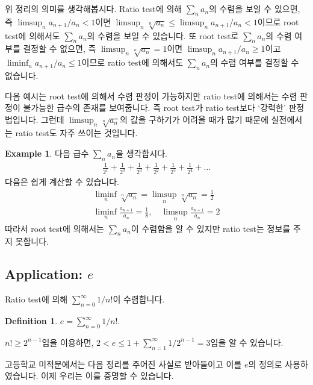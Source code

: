 \documentclass[12pt]{article}
\theoremstyle{definition}
\newtheorem{defn}[thm]{Definition}
\newtheorem*{ex}{Example}
\begin{document}
위 정리의 의미를 생각해봅시다. Ratio test에 의해 \(\sum_n a_n\)의 수렴을 보일 수 있으면, 즉 \(\limsup_n a_{n+1}/a_n < 1\)이면 \(\limsup_n \sqrt[n]{a_n} \le \limsup_n a_{n+1}/a_n < 1\)이므로 root test에 의해서도 \(\sum_n a_n\)의 수렴을 보일 수 있습니다. 또 root test로 \(\sum_n a_n\)의 수렴 여부를 결정할 수 없으면, 즉 \(\limsup_n \sqrt[n]{a_n} = 1\)이면 \(\limsup_n a_{n+1}/a_n \ge 1\)이고 \(\liminf_n a_{n+1}/a_n \le 1\)이므로 ratio test에 의해서도 \(\sum_n a_n\)의 수렴 여부를 결정할 수 없습니다.
\par 다음 예시는 root test에 의해서 수렴 판정이 가능하지만 ratio test에 의해서는 수렴 판정이 불가능한 급수의 존재를 보여줍니다. 즉 root test가 ratio test보다 `강력한' 판정법입니다. 그런데 \(\limsup_n \sqrt[n]{a_n}\)의 값을 구하기가 어려울 때가 많기 때문에 실전에서는 ratio test도 자주 쓰이는 것입니다.

\begin{ex}
	다음 급수 \(\sum_n a_n\)을 생각합시다.
	\begin{gather*}
		\frac{1}{2^1} + \frac{1}{2^0} + \frac{1}{2^3} + \frac{1}{2^2} + \frac{1}{2^5} + \frac{1}{2^4} + \ldots
	\end{gather*}
	다음은 쉽게 계산할 수 있습니다.
	\begin{gather*}
		\liminf_n \sqrt[n]{a_n} = \limsup_n \sqrt[n]{a_n} = \frac{1}{2}\\
		\liminf_n \frac{a_{n+1}}{a_n} = \frac{1}{8}, \quad \limsup_n \frac{a_{n+1}}{a_n} = 2
	\end{gather*}
	따라서 root test에 의해서는 \(\sum_n a_n\)이 수렴함을 알 수 있지만 ratio test는 정보를 주지 못합니다.
\end{ex}

\subsection{Application: \(e\)}

Ratio test에 의해 \(\sum_{n=0}^\infty 1/n!\)이 수렴합니다.

\begin{defn}
	\(e = \sum_{n=0}^\infty 1/n!\).
\end{defn}

\(n! \ge 2^{n-1}\)임을 이용하면, \(2 < e \le 1 + \sum_{n=1}^\infty 1/2^{n-1} = 3\)임을 알 수 있습니다.

고등학교 미적분에서는 다음 정리를 주어진 사실로 받아들이고 이를 \(e\)의 정의로 사용하였습니다. 이제 우리는 이를 증명할 수 있습니다.
\end{document}
